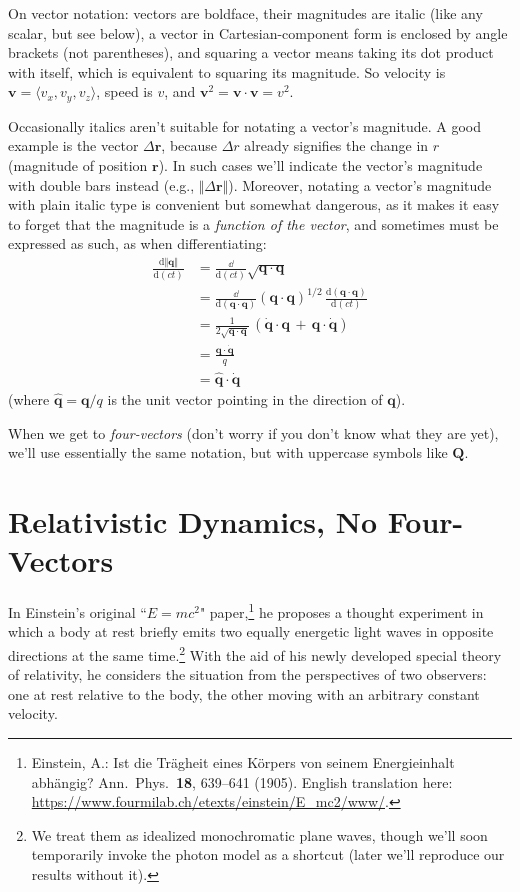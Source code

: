 \documentclass[12pt]{article}
\renewcommand{\vv}[1]{\mathbf{#1}}
\newcommand{\dd}[1]{\mathrm{d}#1}
\begin{document}
On vector notation: vectors are boldface, their magnitudes are italic (like any scalar, but see below), a vector in Cartesian-component form is enclosed by angle brackets (not parentheses), and squaring a vector means taking its dot product with itself, which is equivalent to squaring its magnitude. So velocity is $\vv v = \langle v_x, v_y, v_z \rangle$, speed is $v$, and $\vv v^2 = \vv v \cdot \vv v = v^2$.

Occasionally italics aren't suitable for notating a vector's magnitude. A good example is the vector $\Delta \vv r$, because $\Delta r$ already signifies the change in $r$ (magnitude of position $\vv r$). In such cases we'll indicate the vector's magnitude with double bars instead (e.g., $\Vert \Delta \vv r \Vert$). Moreover, notating a vector's magnitude with plain italic type is convenient but somewhat dangerous, as it makes it easy to forget that the magnitude is a \emph{function of the vector}, and sometimes must be expressed as such, as when differentiating:
\begin{equation*}
\begin{aligned}
\frac{\dd \Vert \vv q \Vert}{\dd (ct)} &= \frac{\dd}{\dd (ct)} \sqrt{ \vv q \cdot \vv q } \\[2pt]
&= \frac{\dd}{\dd (\vv q \cdot \vv q)} \left( \vv q \cdot \vv q \right) ^{1/2} \, \frac{\dd (\vv q \cdot \vv q)}{\dd (ct)} \\[2pt]
&= \frac{1}{2 \sqrt{\vv q \cdot \vv q}} \, \left( \dot{\vv q} \cdot \vv q  \, + \, \vv q \cdot \dot{\vv q} \right) \\[4pt]
&= \frac{\vv q \cdot \dot{\vv q}}{q} \\[4pt]
&= \vv{ \hat q } \cdot \dot{ \vv q }
\end{aligned}
\end{equation*}
(where $\vv{ \hat q } = \vv q / q$ is the unit vector pointing in the direction of $\vv q$).

When we get to \emph{four-vectors} (don't worry if you don't know what they are yet), we'll use essentially the same notation, but with uppercase symbols like $\vv Q$.

\clearpage


\section{Relativistic Dynamics, No Four-Vectors}


In Einstein's original ``$E=mc^2$" paper,\footnote{Einstein, A.: Ist die Tr\"agheit eines K\"orpers von seinem Energieinhalt abh\"angig? Ann.\ Phys.\ \textbf{18}, 639--641 (1905). English translation here: \url{https://www.fourmilab.ch/etexts/einstein/E_mc2/www/}.} he proposes a thought experiment in which a body at rest briefly emits two equally energetic light waves in opposite directions at the same time.\footnote{We treat them as idealized monochromatic plane waves, though we'll soon temporarily invoke the photon model as a shortcut (later we'll reproduce our results without it).} With the aid of his newly developed special theory of relativity, he considers the situation from the perspectives of two observers: one at rest relative to the body, the other moving with an arbitrary constant velocity.
 
\end{document}

